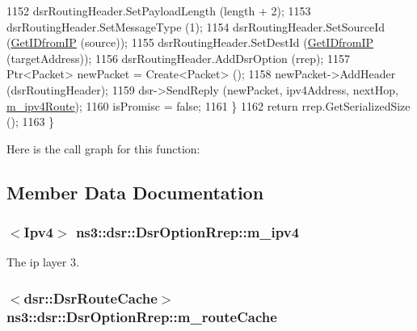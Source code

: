 \begin{DoxyCode}
1152       dsrRoutingHeader.SetPayloadLength (length + 2);
1153       dsrRoutingHeader.SetMessageType (1);
1154       dsrRoutingHeader.SetSourceId (\hyperlink{classns3_1_1dsr_1_1DsrOptions_a7e53a9a0421c607e17866e7dd0dd5440}{GetIDfromIP} (source));
1155       dsrRoutingHeader.SetDestId (\hyperlink{classns3_1_1dsr_1_1DsrOptions_a7e53a9a0421c607e17866e7dd0dd5440}{GetIDfromIP} (targetAddress));
1156       dsrRoutingHeader.AddDsrOption (rrep);
1157       Ptr<Packet> newPacket = Create<Packet> ();
1158       newPacket->AddHeader (dsrRoutingHeader);
1159       dsr->SendReply (newPacket, ipv4Address, nextHop, \hyperlink{classns3_1_1dsr_1_1DsrOptions_ae4785209eae1d101cb8bd2d3b392d2ad}{m\_ipv4Route});
1160       isPromisc = \textcolor{keyword}{false};
1161     \}
1162   \textcolor{keywordflow}{return} rrep.GetSerializedSize ();
1163 \}
\end{DoxyCode}


Here is the call graph for this function\+:




\subsection{Member Data Documentation}
\subsubsection[{\texorpdfstring{m\+\_\+ipv4}{m_ipv4}}]{$<${\bf Ipv4}$>$ ns3\+::dsr\+::\+Dsr\+Option\+Rrep\+::m\+\_\+ipv4\hspace{0.3cm}{\ttfamily [private]}}\hypertarget{classns3_1_1dsr_1_1DsrOptionRrep_a7cfa7876592c810a25f091478b65a2c4}{}\label{classns3_1_1dsr_1_1DsrOptionRrep_a7cfa7876592c810a25f091478b65a2c4}


The ip layer 3. 

\subsubsection[{\texorpdfstring{m\+\_\+route\+Cache}{m_routeCache}}]{$<${\bf dsr\+::\+Dsr\+Route\+Cache}$>$ ns3\+::dsr\+::\+Dsr\+Option\+Rrep\+::m\+\_\+route\+Cache\hspace{0.3cm}{\ttfamily [private]}}\hypertarget{classns3_1_1dsr_1_1DsrOptionRrep_ae289cef15b97d8b41f3cc8b9a5de4124}{}\label{classns3_1_1dsr_1_1DsrOptionRrep_ae289cef15b97d8b41f3cc8b9a5de4124}


